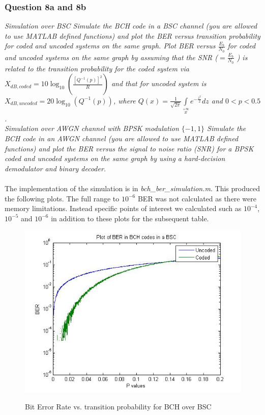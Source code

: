 \documentclass[a4paper]{article}
\begin{document}
\subsubsection{Question 8a and 8b} \textit{Simulation over BSC Simulate the BCH code in a BSC channel (you are allowed to use MATLAB defined functions) and plot the BER versus transition probability for coded and uncoded systems on the same graph. Plot BER versus $\frac{E_b}{N_0}$ for coded and uncoded systems on the same graph by assuming that the SNR ($ = \frac{E_b}{N_0}$ ) is related to the transition probability for the coded system via $X_{dB,coded} = 10 \log_{10}(\frac{[Q^{- 1} (p)]^2}{R}) $ and that for uncoded system is $X_{dB,uncoded} = 20\log_{10}(Q^{- 1} (p)) $, where $Q(x) = \frac{1}{\sqrt{2 \pi}} \int\limits_{x}\limits^{+\infty} e^{ -\frac{z^2}{2}} dz $ and $0 < p < 0.5$.}\\
\textit{Simulation over AWGN channel with BPSK modulation $\{-1, 1\}$ Simulate the BCH code in an AWGN channel (you are allowed to use MATLAB defined functions) and plot the BER versus the signal to noise ratio (SNR) for a BPSK coded and uncoded systems on the same graph by using a hard-decision demodulator and binary decoder.}\\
\\
The implementation of the simulation is in \textit{bch\_ber\_simulation.m}.
This produced the following plots. The full range to $10^{-6}$ BER was not calculated as there were memory limitations. Instead specific points of interest we calculated such as $10^{-4}$, $10^{-5}$ and $10^{-6}$ in addition to these plots for the subsequent table.\\

\begin{figure}[H]
\centering
\includegraphics[scale=0.5]{plotBER_BSC_pvals.jpg} \\
\caption{Bit Error Rate vs. transition probability for BCH over BSC}
\end{figure}
\end{document}
